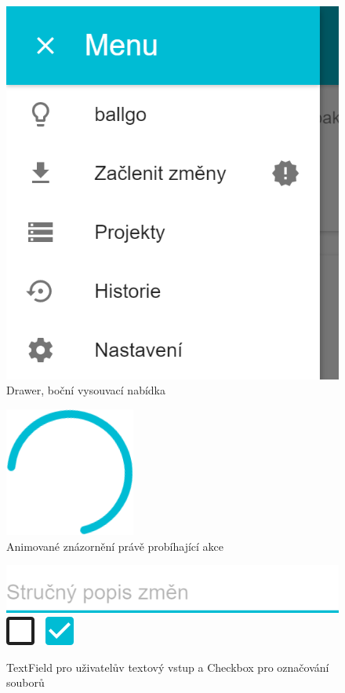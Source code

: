 \begin{figure}[ht]
	\centering
	\includegraphics[scale=0.5]{sections/ui/images/Drawer.png}
	\caption[Drawer]{Drawer, boční vysouvací nabídka}
	\label{fig:drawer}
\end{figure}

\begin{figure}[ht]
	\centering
	\includegraphics[scale=0.5]{sections/ui/images/Progress.png}
	\caption[Progress]{Animované znázornění právě probíhající akce}
	\label{fig:progress}
\end{figure}

\begin{figure}[ht]
	\mbox{\includegraphics[scale=0.5]{sections/ui/images/TextField.png}}   
	\hspace{12px}
	\mbox{\includegraphics[scale=0.5]{sections/ui/images/Checkbox.png}}
	\caption[TextField a Checkbox]{TextField pro uživatelův textový vstup a Checkbox pro označování souborů}
	\label{fig:form}
\end{figure}

\FloatBarrier
